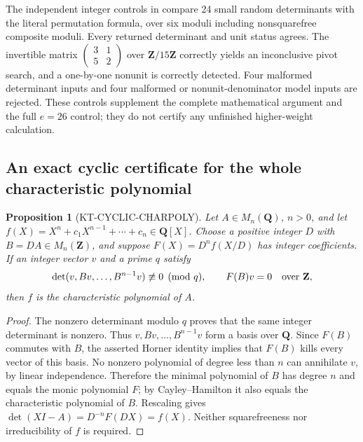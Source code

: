 \documentclass[11pt,a4paper]{article}
\newtheorem{proposition}[theorem]{Proposition}
\theoremstyle{definition}
\begin{document}
The independent integer controls in
 compare 24 small random
determinants with the literal permutation formula, over six
moduli including nonsquarefree composite moduli.  Every
returned determinant and unit status agrees.  The invertible
matrix $\left(\begin{smallmatrix}3&1\\5&2\end{smallmatrix}\right)$
over $\mathbf Z/15\mathbf Z$ correctly yields an inconclusive
pivot search, and a one-by-one nonunit is correctly detected.
Four malformed determinant inputs and four malformed or
nonunit-denominator model inputs are rejected.  These controls
supplement the complete mathematical argument and the full
$e=26$ control; they do not certify any unfinished higher-weight
calculation.



\subsection{An exact cyclic certificate for the whole characteristic polynomial}
\begin{proposition}[KT-CYCLIC-CHARPOLY]
Let $A\in M_n(\mathbf Q)$, $n>0$, and let
$f(X)=X^n+c_1X^{n-1}+\cdots+c_n\in\mathbf Q[X]$.
Choose a positive integer $D$ with $B=DA\in M_n(\mathbf Z)$,
and suppose $F(X)=D^nf(X/D)$ has integer coefficients.
If an integer vector $v$ and a prime $q$ satisfy
\[
 \det(v,Bv,\ldots,B^{n-1}v)\not\equiv0\pmod q,
 \qquad F(B)v=0\quad\hbox{over }\mathbf Z,
\]
then $f$ is the characteristic polynomial of $A$.
\end{proposition}
\begin{proof}
The nonzero determinant modulo $q$ proves that the same integer
determinant is nonzero. Thus $v,Bv,\ldots,B^{n-1}v$ form a basis
over $\mathbf Q$. Since $F(B)$ commutes with $B$, the asserted
Horner identity implies that $F(B)$ kills every vector of this
basis. No nonzero polynomial of degree less than $n$ can
annihilate $v$, by linear independence. Therefore the minimal
polynomial of $B$ has degree $n$ and equals the monic polynomial
$F$; by Cayley--Hamilton it also equals the characteristic
polynomial of $B$. Rescaling gives
$\det(XI-A)=D^{-n}F(DX)=f(X)$.
Neither squarefreeness nor irreducibility of $f$ is required.
\end{proof}
\end{document}
